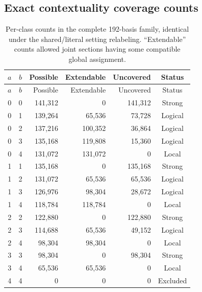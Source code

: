 \subsection{Exact contextuality coverage counts}
\begin{longtable}{@{}ccrrrc@{}}
\caption{Per-class counts in the complete 192-basis family, identical under the shared/literal setting relabeling. ``Extendable'' counts allowed joint sections having some compatible global assignment.}\label{tab:contexts}\\
\toprule $a$ & $b$ & Possible & Extendable & Uncovered & Status\\\midrule\endfirsthead
\toprule $a$ & $b$ & Possible & Extendable & Uncovered & Status\\\midrule\endhead
0 & 0 & 141,312 & 0 & 141,312 & Strong\\
0 & 1 & 139,264 & 65,536 & 73,728 & Logical\\
0 & 2 & 137,216 & 100,352 & 36,864 & Logical\\
0 & 3 & 135,168 & 119,808 & 15,360 & Logical\\
0 & 4 & 131,072 & 131,072 & 0 & Local\\
1 & 1 & 135,168 & 0 & 135,168 & Strong\\
1 & 2 & 131,072 & 65,536 & 65,536 & Logical\\
1 & 3 & 126,976 & 98,304 & 28,672 & Logical\\
1 & 4 & 118,784 & 118,784 & 0 & Local\\
2 & 2 & 122,880 & 0 & 122,880 & Strong\\
2 & 3 & 114,688 & 65,536 & 49,152 & Logical\\
2 & 4 & 98,304 & 98,304 & 0 & Local\\
3 & 3 & 98,304 & 0 & 98,304 & Strong\\
3 & 4 & 65,536 & 65,536 & 0 & Local\\
4 & 4 & 0 & 0 & 0 & Excluded\\
\bottomrule\end{longtable}
